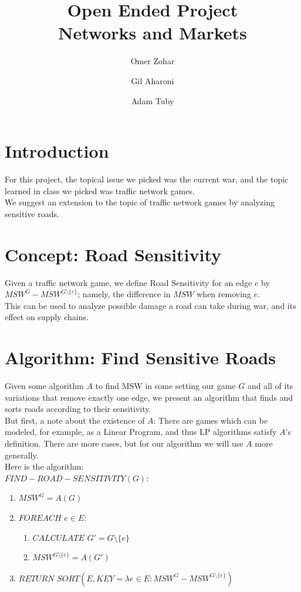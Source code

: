 \title{
    Open Ended Project\\
    Networks and Markets
}
\author{
    Omer Zohar
    \and
    Gil Aharoni
    \and
    Adam Tuby
}






\maketitle

\section{Introduction}

For this project, the topical issue we picked was the current war, and the topic learned in class we picked was traffic network games.\\
We suggest an extension to the topic of traffic network games by analyzing sensitive roads.

\section{Concept: Road Sensitivity}
Given a traffic network game, we define Road Sensitivity for an edge $e$ by $MSW^G-MSW^{G\setminus\{e\}}$; namely, the difference in $MSW$ when removing $e$.\\
This can be used to analyze possible damage a road can take during war, and its effect on supply chains.

\section{Algorithm: Find Sensitive Roads}
Given some algorithm $A$ to find MSW in some setting our game $G$ and all of its variations that remove exactly one edge, we present an algorithm that finds and sorts roads according to their sensitivity.\\
But first, a note about the existence of $A$: There are games which can be modeled, for example, as a Linear Program, and thus LP algorithms satisfy $A$'s definition. There are more cases, but for our algorithm we will use $A$ more generally.\\
Here is the algorithm:\\
$FIND-ROAD-SENSITIVITY(G):$
\begin{enumerate}
    \item $MSW^G=A(G)$
    \item $FOREACH$ $e\in E:$
    \begin{enumerate}
        \item $CALCULATE$ $G'=G\setminus\{e\}$
        \item $MSW^{G\setminus\{e\}}=A(G')$
    \end{enumerate}
\item $RETURN$ $SORT(E,KEY=\lambda e \in E:MSW^G-MSW^{G\setminus\{e\}})$
\end{enumerate}

